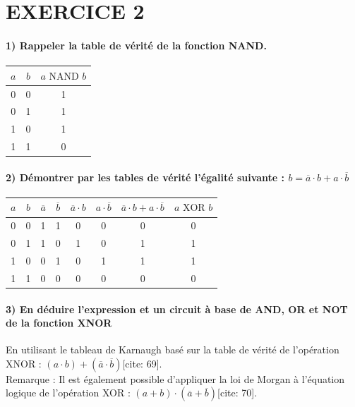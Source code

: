 \documentclass[11pt,a4paper]{article}
\begin{document}
\section*{EXERCICE 2}

\paragraph{1) Rappeler la table de vérité de la fonction NAND.}
\begin{table}[h!]
    \centering
    \begin{tabular}{cc|c}
        \toprule
        $a$ & $b$ & $a \text{ NAND } b$ \\
        \midrule
        0 & 0 & 1 \\
        0 & 1 & 1 \\
        1 & 0 & 1 \\
        1 & 1 & 0 \\
        \bottomrule
    \end{tabular}
\end{table}

\paragraph{2) Démontrer par les tables de vérité l'égalité suivante : $b = \overline{a}\cdot b + a\cdot\overline{b}$}
\begin{table}[h!]
    \centering
    \begin{tabular}{cc|cc|cc|c|c}
        \toprule
        $a$ & $b$ & $\overline{a}$ & $\overline{b}$ & $\overline{a}\cdot b$ & $a\cdot\overline{b}$ & $\overline{a}\cdot b + a\cdot\overline{b}$ & $a \text{ XOR } b$ \\
        \midrule
        0 & 0 & 1 & 1 & 0 & 0 & 0 & 0 \\
        0 & 1 & 1 & 0 & 1 & 0 & 1 & 1 \\
        1 & 0 & 0 & 1 & 0 & 1 & 1 & 1 \\
        1 & 1 & 0 & 0 & 0 & 0 & 0 & 0 \\
        \bottomrule
    \end{tabular}
\end{table}

\paragraph{3) En déduire l'expression et un circuit à base de AND, OR et NOT de la fonction XNOR}
En utilisant le tableau de Karnaugh basé sur la table de vérité de l'opération XNOR : $(a\cdot b)+(\overline{a}\cdot\overline{b})$[cite: 69].\\
Remarque : Il est également possible d'appliquer la loi de Morgan à l'équation logique de l'opération XOR : $(a+b)\cdot(\overline{a}+\overline{b})$[cite: 70].
\end{document}
